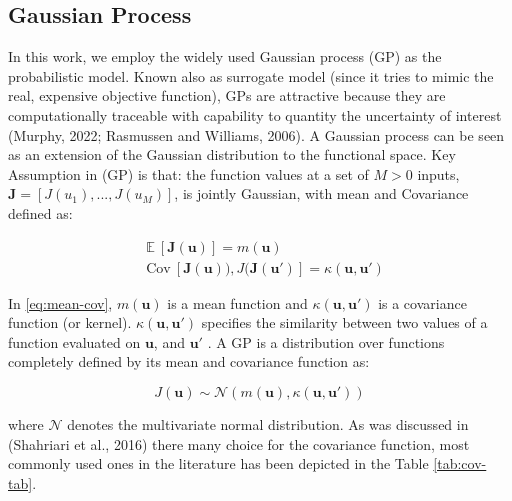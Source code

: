 \documentclass[]{elsarticle} %
\begin{document}
\hypertarget{gaussian-process}{%
\subsection{Gaussian Process}\label{gaussian-process}}

In this work, we employ the widely used Gaussian process (GP) as the probabilistic model. Known also as surrogate model (since it tries to mimic the real, expensive objective function), GPs are attractive because they are computationally traceable with capability to quantity the uncertainty of interest (Murphy, 2022; Rasmussen and Williams, 2006). A Gaussian process can be seen as an extension of the Gaussian distribution to the functional space. Key Assumption in (GP) is that: the function values at a set of \(M > 0\) inputs, \(\mathbf{J} = [J({u_1}), ...,J(u_M)]\), is jointly Gaussian, with mean and Covariance defined as:

\begin{equation}
  \begin{split}
& \mathbb{E} \: [\mathbf{J(u)}]= m(\mathbf{u}) \\
& \text{Cov} \: [\mathbf{J(u)}),J(\mathbf{J(u')}]= \kappa(\mathbf{u},\mathbf{u'})
  \end{split}
\label{eq:mean-cov}
\end{equation}

In \eqref{eq:mean-cov}, \(m(\mathbf{u})\) is a mean function and \(\kappa(\mathbf{u},\mathbf{u'})\) is a covariance function (or kernel). \(\kappa(\mathbf{u},\mathbf{u'})\) specifies the similarity between two values of a function evaluated on \(\mathbf{u}\), and \(\mathbf{u'}\) . A GP is a distribution over functions completely defined by its mean and covariance function as:

\begin{equation}
J(\mathbf{u}) \sim \mathcal{N}(m(\mathbf{u}), \kappa(\mathbf{u},\mathbf{u'}))
\label{eq:mean_cov_gp}
\end{equation}

where \(\mathcal{N}\) denotes the multivariate normal distribution. As was discussed in (Shahriari et al., 2016) there many choice for the covariance function, most commonly used ones in the literature has been depicted in the Table \ref{tab:cov-tab}.
\end{document}
